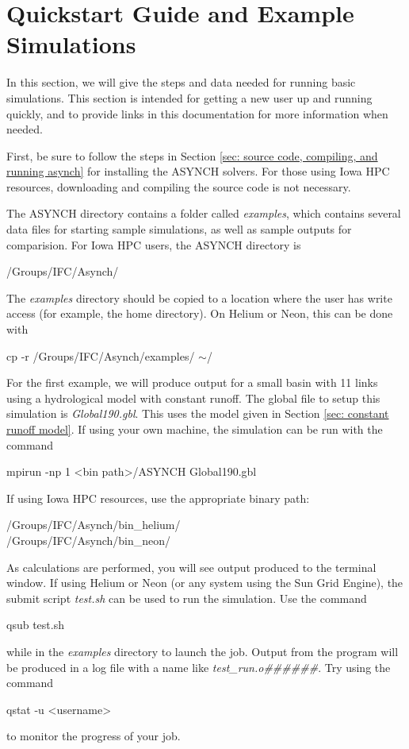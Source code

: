 \documentclass[12pt]{article}
\newenvironment{codeindent}
{\begin{list}{}
        {\setlength{\leftmargin}{.1in}}
        \item[]
}
{\end{list}}
\begin{document}
\section{Quickstart Guide and Example Simulations} \label{sec: quickstart}

In this section, we will give the steps and data needed for running basic simulations. This section is intended for getting a new user up and running quickly, and to provide links in this documentation for more information when needed.

First, be sure to follow the steps in Section \ref{sec: source code, compiling, and running asynch} for installing the ASYNCH solvers. For those using Iowa HPC resources, downloading and compiling the source code is not necessary.

The ASYNCH directory contains a folder called \emph{examples}, which contains several data files for starting sample simulations, as well as sample outputs for comparision. For Iowa HPC users, the ASYNCH directory is 
\begin{codeindent}
/Groups/IFC/Asynch/
\end{codeindent}
The \emph{examples} directory should be copied to a location where the user has write access (for example, the home directory). On Helium or Neon, this can be done with
\begin{codeindent}
 cp -r /Groups/IFC/Asynch/examples/ $\sim$/
\end{codeindent}


For the first example, we will produce output for a small basin with 11 links using a hydrological model with constant runoff. The global file to setup this simulation is \emph{Global190.gbl}. This uses the model given in Section \ref{sec: constant runoff model}. If using your own machine, the simulation can be run with the command
\begin{codeindent}
 mpirun -np 1 <bin path>/ASYNCH Global190.gbl
\end{codeindent}
If using Iowa HPC resources, use the appropriate binary path:
\begin{codeindent}
 /Groups/IFC/Asynch/bin\_helium/ \\
 /Groups/IFC/Asynch/bin\_neon/
\end{codeindent}
As calculations are performed, you will see output produced to the terminal window. If using Helium or Neon (or any system using the Sun Grid Engine), the submit script \emph{test.sh} can be used to run the simulation. Use the command
\begin{codeindent}
 qsub test.sh
\end{codeindent}
while in the \emph{examples} directory to launch the job. Output from the program will be produced in a log file with a name like \emph{test\_run.o\#\#\#\#\#\#}. Try using the command
\begin{codeindent}
 qstat -u <username>
\end{codeindent}
to monitor the progress of your job.
\end{document}
